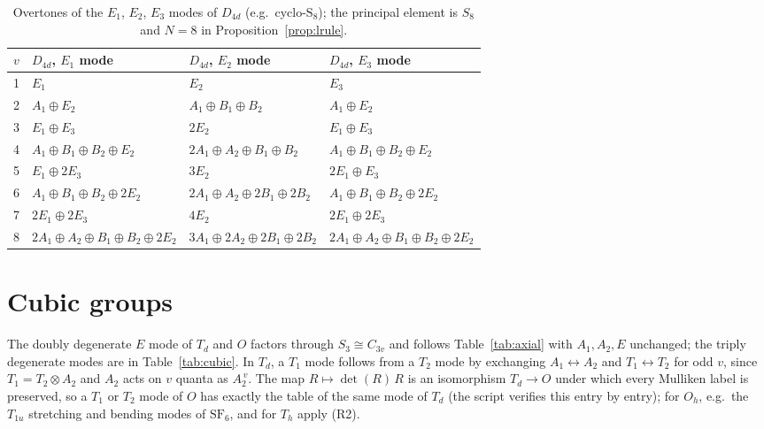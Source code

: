 \documentclass[11pt]{article}
\begin{document}
\begin{table}[H]
\centering\small
\begin{tabular}{c|lll}
\hline
$v$ & $D_{4d}$, $E_{1}$ mode & $D_{4d}$, $E_{2}$ mode & $D_{4d}$, $E_{3}$ mode\\
\hline
1 & $E_{1}$ & $E_{2}$ & $E_{3}$\\
2 & $A_{1}\oplus E_{2}$ & $A_{1}\oplus B_{1}\oplus B_{2}$ & $A_{1}\oplus E_{2}$\\
3 & $E_{1}\oplus E_{3}$ & $2E_{2}$ & $E_{1}\oplus E_{3}$\\
4 & $A_{1}\oplus B_{1}\oplus B_{2}\oplus E_{2}$ & $2A_{1}\oplus A_{2}\oplus B_{1}\oplus B_{2}$ & $A_{1}\oplus B_{1}\oplus B_{2}\oplus E_{2}$\\
5 & $E_{1}\oplus 2E_{3}$ & $3E_{2}$ & $2E_{1}\oplus E_{3}$\\
6 & $A_{1}\oplus B_{1}\oplus B_{2}\oplus 2E_{2}$ & $2A_{1}\oplus A_{2}\oplus 2B_{1}\oplus 2B_{2}$ & $A_{1}\oplus B_{1}\oplus B_{2}\oplus 2E_{2}$\\
7 & $2E_{1}\oplus 2E_{3}$ & $4E_{2}$ & $2E_{1}\oplus 2E_{3}$\\
8 & $2A_{1}\oplus A_{2}\oplus B_{1}\oplus B_{2}\oplus 2E_{2}$ & $3A_{1}\oplus 2A_{2}\oplus 2B_{1}\oplus 2B_{2}$ & $2A_{1}\oplus A_{2}\oplus B_{1}\oplus B_{2}\oplus 2E_{2}$\\
\hline
\end{tabular}
\caption{Overtones of the $E_1$, $E_2$, $E_3$ modes of $D_{4d}$ (e.g.\ cyclo-$\mathrm S_8$); the principal element is $S_8$ and $N=8$ in Proposition~\ref{prop:lrule}.}
\label{tab:axial3}
\end{table}

\section{Cubic groups}

The doubly degenerate $E$ mode of $T_d$ and $O$ factors through $S_3\cong C_{3v}$ and follows Table~\ref{tab:axial} with $A_1,A_2,E$ unchanged; the triply degenerate modes are in Table~\ref{tab:cubic}. In $T_d$, a $T_1$ mode follows from a $T_2$ mode by exchanging $A_1\leftrightarrow A_2$ and $T_1\leftrightarrow T_2$ for odd $v$, since $T_1=T_2\otimes A_2$ and $A_2$ acts on $v$ quanta as $A_2^{\,v}$. The map $R\mapsto\det(R)\,R$ is an isomorphism $T_d\to O$ under which every Mulliken label is preserved, so a $T_1$ or $T_2$ mode of $O$ has exactly the table of the same mode of $T_d$ (the script verifies this entry by entry); for $O_h$, e.g.\ the $T_{1u}$ stretching and bending modes of $\mathrm{SF_6}$, and for $T_h$ apply (R2).
\end{document}
